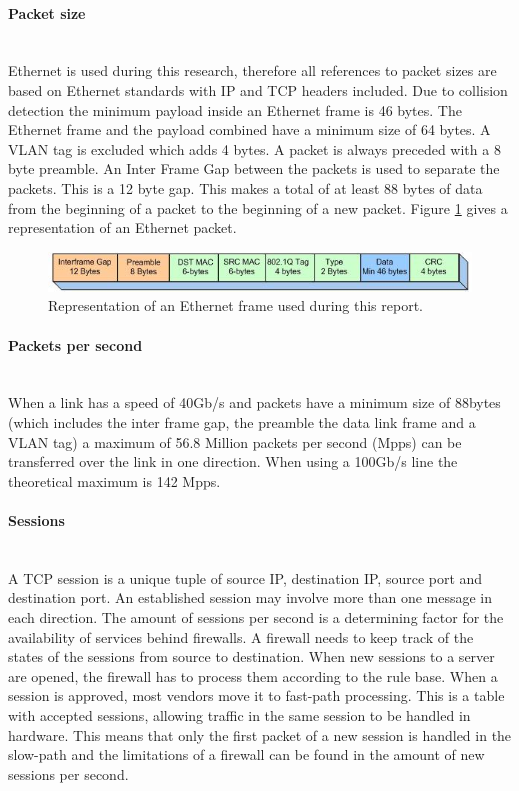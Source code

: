 \paragraph{Packet size}\label{par:packetsize}\mbox{}\\
Ethernet is used during this research, therefore all references to packet sizes are based on Ethernet standards\cite{ethernet_frame_2017} with IP and TCP headers included.
Due to collision detection the minimum payload inside an Ethernet frame is 46 bytes.
The Ethernet frame and the payload combined have a minimum size of 64 bytes. 
A VLAN tag is excluded which adds 4 bytes.
A packet is always preceded with a 8 byte preamble.
An Inter Frame Gap between the packets is used to separate the packets. This is a 12 byte gap. 
This makes a total of at least 88 bytes of data from the beginning of a packet to the beginning of a new packet. Figure \ref{fig:juniperethernetframe} gives a representation of an Ethernet packet. 

\begin{figure}[H]
  \includegraphics[scale=1]{images/ethernetframe.jpg}
  \caption{Representation of an Ethernet frame used during this report.}
  \label{fig:juniperethernetframe}
\end{figure}

\paragraph{Packets per second}\label{par:pps}\mbox{}\\
When a link has a speed of 40Gb/s and packets have a minimum size of 88bytes (which includes the inter frame gap, the preamble the data link frame and a VLAN tag) a maximum of 56.8 Million packets per second (Mpps) can be transferred over the link in one direction. When using a 100Gb/s line the theoretical maximum is 142 Mpps.   

\paragraph{Sessions}\label{par:sessions}\mbox{}\\
A TCP session is a unique tuple of source IP, destination IP, source port and destination port. An established session may involve more than one message in each direction.
The amount of sessions per second is a determining factor for the availability of services behind firewalls. A firewall needs to keep track of the states of the sessions from source to destination. 
When new sessions to a server are opened, the firewall has to process them according to the rule base. When a session is approved, most vendors move it to fast-path processing. 
This is a table with accepted sessions, allowing traffic in the same session to be handled in hardware. This means that only the first packet of a new session is handled in the slow-path and the limitations of a firewall can be found in the amount of new sessions per second.

